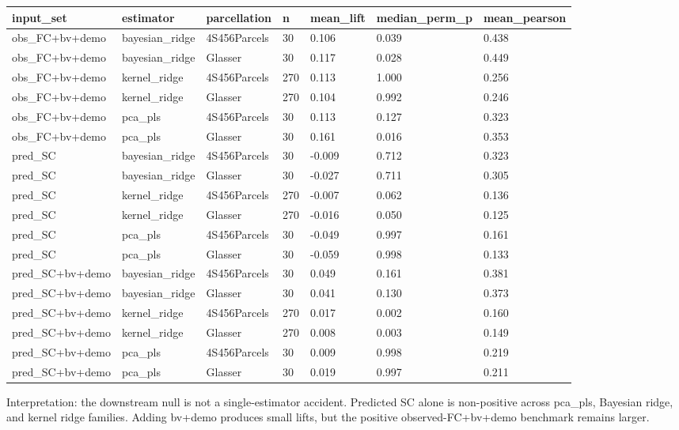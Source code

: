 {\def\LTcaptype{none} %
\begin{longtable}[]{@{}lllllll@{}}
\toprule\noalign{}
input\_set & estimator & parcellation & n & mean\_lift & median\_perm\_p & mean\_pearson \\
\midrule\noalign{}
\endhead
\bottomrule\noalign{}
\endlastfoot
obs\_FC+bv+demo & bayesian\_ridge & 4S456Parcels & 30 & 0.106 & 0.039 & 0.438 \\
obs\_FC+bv+demo & bayesian\_ridge & Glasser & 30 & 0.117 & 0.028 & 0.449 \\
obs\_FC+bv+demo & kernel\_ridge & 4S456Parcels & 270 & 0.113 & 1.000 & 0.256 \\
obs\_FC+bv+demo & kernel\_ridge & Glasser & 270 & 0.104 & 0.992 & 0.246 \\
obs\_FC+bv+demo & pca\_pls & 4S456Parcels & 30 & 0.113 & 0.127 & 0.323 \\
obs\_FC+bv+demo & pca\_pls & Glasser & 30 & 0.161 & 0.016 & 0.353 \\
pred\_SC & bayesian\_ridge & 4S456Parcels & 30 & -0.009 & 0.712 & 0.323 \\
pred\_SC & bayesian\_ridge & Glasser & 30 & -0.027 & 0.711 & 0.305 \\
pred\_SC & kernel\_ridge & 4S456Parcels & 270 & -0.007 & 0.062 & 0.136 \\
pred\_SC & kernel\_ridge & Glasser & 270 & -0.016 & 0.050 & 0.125 \\
pred\_SC & pca\_pls & 4S456Parcels & 30 & -0.049 & 0.997 & 0.161 \\
pred\_SC & pca\_pls & Glasser & 30 & -0.059 & 0.998 & 0.133 \\
pred\_SC+bv+demo & bayesian\_ridge & 4S456Parcels & 30 & 0.049 & 0.161 & 0.381 \\
pred\_SC+bv+demo & bayesian\_ridge & Glasser & 30 & 0.041 & 0.130 & 0.373 \\
pred\_SC+bv+demo & kernel\_ridge & 4S456Parcels & 270 & 0.017 & 0.002 & 0.160 \\
pred\_SC+bv+demo & kernel\_ridge & Glasser & 270 & 0.008 & 0.003 & 0.149 \\
pred\_SC+bv+demo & pca\_pls & 4S456Parcels & 30 & 0.009 & 0.998 & 0.219 \\
pred\_SC+bv+demo & pca\_pls & Glasser & 30 & 0.019 & 0.997 & 0.211 \\
\end{longtable}
}

Interpretation: the downstream null is not a single-estimator accident. Predicted SC alone is non-positive across pca\_pls, Bayesian ridge, and kernel ridge families. Adding bv+demo produces small lifts, but the positive observed-FC+bv+demo benchmark remains larger.


